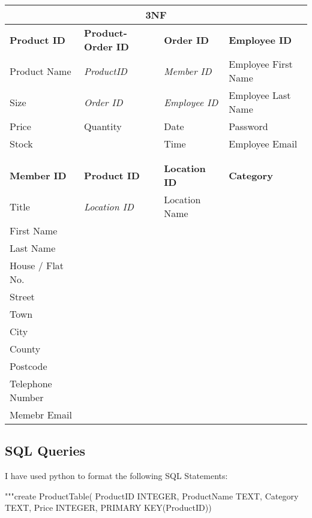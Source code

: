 \begin{python}
\begin{flushleft}
\begin{center}
    \begin{tabular}{|p{3cm}|p{3cm}|p{3cm}|p{2cm}|}
        \hline
	 \multicolumn{4}{|c|}{3NF} \\ \hline
	\textbf{Product ID}  & \textbf{Product-Order ID} & \textbf{Order ID} & \textbf{Employee ID} \\ \hline
	{Product Name} & \textit{ProductID} & \textit{Member ID} & {Employee First Name} \\ \hline
	{Size} & \textit{Order ID} & \textit{Employee ID} & {Employee Last Name} \\ \hline
	{Price} & {Quantity} & {Date} & {Password} \\ \hline
	{Stock} & {} & {Time} & {Employee Email} \\ \hline
	{} & {} & {} & {}\\ \hline
	{} & {} & {} & {}\\ \hline
	\textbf{Member ID} & \textbf{Product ID} & \textbf{Location ID} & \textbf{Category}\\ \hline
	{Title} & \textit{Location ID} & {Location Name} & {}\\ \hline
	{First Name} & {} & {} & {}\\ \hline
	{Last Name} & {} & {} & {}\\ \hline
	{House / Flat No.} & {} & {} & {}\\ \hline
	{Street} & {} & {} & {}\\ \hline
	{Town} & {} & {} & {}\\ \hline
	{City} & {} & {} & {}\\ \hline
	{County} & {} & {} & {}\\ \hline
	{Postcode} & {} & {} & {}\\ \hline
	{Telephone Number} & {} & {} & {}\\ \hline
	{Memebr Email} & {} & {} & {}\\ \hline
    \end{tabular}
\end{center}
\end{flushleft}

\subsection{SQL Queries}

I have used python to format the following SQL Statements:
\begin{python}
"""create ProductTable(
 ProductID INTEGER,
 ProductName TEXT,
 Category TEXT,
 Price INTEGER,
 PRIMARY KEY(ProductID))
\end{python}


\end{python}
